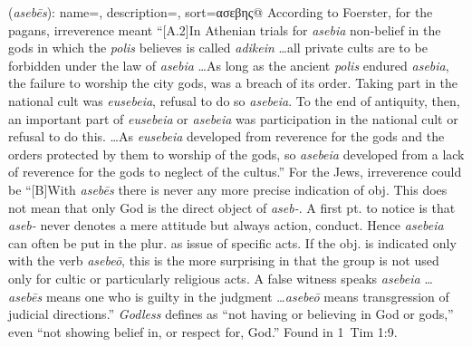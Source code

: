 \item[Godless,]

(\textit{asebēs}):
{
    name=,
    description={},
    sort=ασεβης@
}
According to Foerster, for the pagans, irreverence meant ``[A.2]In Athenian trials for \emph{asebia} non-belief in the gods in which the \emph{polis} believes is called \emph{adikein} \ldots all private cults are to be forbidden under the law of \emph{asebia} \ldots As long as the ancient \emph{polis} endured \emph{asebia}, the failure to worship the city gods, was a breach of its order. Taking part in the national cult was \emph{eusebeia}, refusal to do so \emph{asebeia}. To the end of antiquity, then, an important part of \emph{eusebeia} or \emph{asebeia} was participation in the national cult or refusal to do this. \ldots As \emph{eusebeia} developed from reverence for the gods and the orders protected by them to worship of the gods, so \emph{asebeia} developed from a lack of reverence for the gods  to neglect of the cultus.''
For the Jews, irreverence could be ``[B]With \emph{asebēs} there is never any more precise indication of obj. This does not mean that only God is the direct object of \emph{aseb-}. A first pt. to notice is that \emph{aseb-} never denotes a mere attitude but always action, conduct. Hence \emph{asebeia} can often be put in the plur. as issue of specific acts. If the obj. is indicated only with the verb \emph{asebeō}, this is the more surprising in that the group is not used only for cultic or particularly religious acts. A false witness speaks \emph{asebeia} \ldots \emph{asebēs} means one who is guilty in the judgment \ldots \emph{asebeō} means transgression of judicial directions.''
\emph{Godless} defines as ``not having or believing in God or gods,'' even ``not showing belief in, or respect for, God.''
Found in 1~Tim 1:9.

